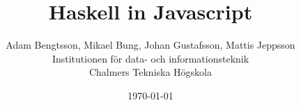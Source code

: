 \documentclass[a4paper, 12pt]{article}
\begin{document}
    \title{Haskell in Javascript}
    \author{Adam Bengtsson, Mikael Bung, Johan Gustafsson, Mattis Jeppsson \\ Institutionen för data- och informationsteknik \\ Chalmers Tekniska Högskola }
    \date{\today}
    \maketitle
    \newpage

    \tableofcontents
    \newpage

    \listoffigures
    \newpage
    
    \newpage
    
    \newpage
    
    \newpage
    
    \newpage
    
    \newpage
    
    \newpage
    
    \newpage
    
    \newpage
    
    \newpage
    
    \newpage
    

    
     
    
    
\end{document}

